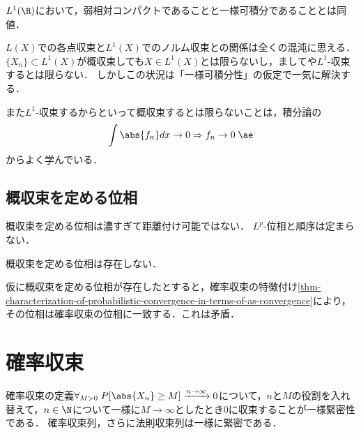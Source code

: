\documentclass[uplatex,dvipdfmx]{jsreport}
\begin{document}
\begin{tcolorbox}[colframe=ForestGreen, colback=ForestGreen!10!white,breakable,colbacktitle=ForestGreen!40!white,coltitle=black,fonttitle=\bfseries\sffamily,
title=]
    $L^1(\R)$において，弱相対コンパクトであることと一様可積分であることとは同値．
\end{tcolorbox}

\begin{discussion}
    $L(X)$での各点収束と$L^1(X)$でのノルム収束との関係は全くの混沌に思える．
    $\{X_n\}\subset L^1(X)$が概収束しても$X\in L^1(X)$とは限らないし，ましてや$L^1$-収束するとは限らない．
    しかしこの状況は「一様可積分性」の仮定で一気に解決する．
    
    また$L^1$-収束するからといって概収束するとは限らないことは，積分論の
    \[\int\abs{f_n}dx\to0\Rightarrow f_n\to0\;\ae\]
    からよく学んでいる．
\end{discussion}

\subsection{概収束を定める位相}

\begin{tcolorbox}[colframe=ForestGreen, colback=ForestGreen!10!white,breakable,colbacktitle=ForestGreen!40!white,coltitle=black,fonttitle=\bfseries\sffamily,
title=]
    概収束を定める位相は濃すぎて距離付け可能ではない．
    $L^p$-位相と順序は定まらない．
\end{tcolorbox}

\begin{proposition}
    概収束を定める位相は存在しない．
\end{proposition}
\begin{Proof}
    仮に概収束を定める位相が存在したとすると，確率収束の特徴付け\ref{thm-characterization-of-probabilistic-convergence-in-terms-of-as-convergence}により，
    その位相は確率収束の位相に一致する．これは矛盾．
\end{Proof}

\section{確率収束}

\begin{tcolorbox}[colframe=ForestGreen, colback=ForestGreen!10!white,breakable,colbacktitle=ForestGreen!40!white,coltitle=black,fonttitle=\bfseries\sffamily,
title=]
    確率収束の定義$\forall_{M>0}\;P[\abs{X_n}\ge M]\xrightarrow{n\to\infty}0$について，$n$と$M$の役割を入れ替えて，$n\in\N$について一様に$M\to\infty$としたとき$0$に収束することが一様緊密性である．
    確率収束列，さらに法則収束列は一様に緊密である．
\end{tcolorbox}
\end{document}
